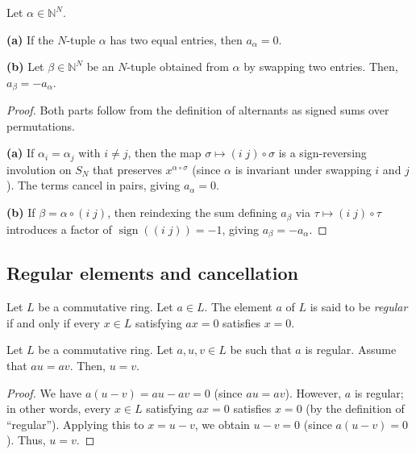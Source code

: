 \begin{lemma}
\label{lem.sf.alternant-0-lr}
\leantarget
\leanok
Let $\alpha\in\mathbb{N}^{N}$.

\medskip

\textbf{(a)} If the $N$-tuple $\alpha$ has two equal entries, then $a_{\alpha
}=0$.

\medskip

\textbf{(b)} Let $\beta\in\mathbb{N}^{N}$ be an $N$-tuple obtained from
$\alpha$ by swapping two entries. Then, $a_{\beta}=-a_{\alpha}$.
\end{lemma}

\begin{proof}
\leanok
Both parts follow from the definition of alternants as signed sums over
permutations.

\textbf{(a)} If $\alpha_i = \alpha_j$ with $i \neq j$, then the map
$\sigma \mapsto (i\;j) \circ \sigma$ is a sign-reversing involution on $S_N$
that preserves $x^{\alpha \circ \sigma}$ (since $\alpha$ is invariant under
swapping $i$ and $j$). The terms cancel in pairs, giving $a_{\alpha} = 0$.

\textbf{(b)} If $\beta = \alpha \circ (i\;j)$, then reindexing the sum
defining $a_{\beta}$ via $\tau \mapsto (i\;j) \circ \tau$ introduces a factor
of $\operatorname{sign}((i\;j)) = -1$, giving $a_{\beta} = -a_{\alpha}$.
\end{proof}

\subsection{Regular elements and cancellation}

\begin{definition}
\label{def.cring.reg}
\leantarget
\leanok
Let $L$ be a commutative ring. Let $a\in L$. The element
$a$ of $L$ is said to be \emph{regular} if and only if every $x\in L$
satisfying $ax=0$ satisfies $x=0$.
\end{definition}

\begin{lemma}
\label{lem.cring.reg.cancel}
\leantarget
\leanok
Let $L$ be a commutative ring. Let $a,u,v\in L$ be
such that $a$ is regular. Assume that $au=av$. Then, $u=v$.
\end{lemma}

\begin{proof}
\leanok
We have $a\left(  u-v\right)
=au-av=0$ (since $au=av$). However, $a$ is regular; in other words, every
$x\in L$ satisfying $ax=0$ satisfies $x=0$ (by the definition of
``regular''). Applying this to $x=u-v$, we
obtain $u-v=0$ (since $a\left(  u-v\right)  =0$). Thus, $u=v$.
\end{proof}

